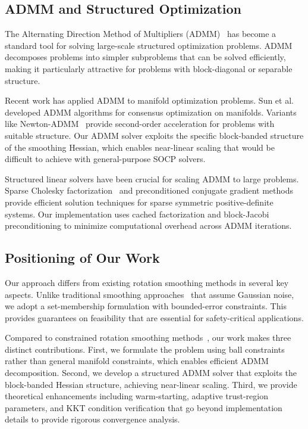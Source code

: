 \subsection{ADMM and Structured Optimization}

The Alternating Direction Method of Multipliers (ADMM)~\cite{admm} has become a standard tool for solving large-scale structured optimization problems. ADMM decomposes problems into simpler subproblems that can be solved efficiently, making it particularly attractive for problems with block-diagonal or separable structure.

Recent work has applied ADMM to manifold optimization problems. Sun et al.~\cite{sun_admm} developed ADMM algorithms for consensus optimization on manifolds. Variants like Newton-ADMM~\cite{newton_admm} provide second-order acceleration for problems with suitable structure. Our ADMM solver exploits the specific block-banded structure of the smoothing Hessian, which enables near-linear scaling that would be difficult to achieve with general-purpose SOCP solvers.

Structured linear solvers have been crucial for scaling ADMM to large problems. Sparse Cholesky factorization~\cite{golub} and preconditioned conjugate gradient methods~\cite{saad} provide efficient solution techniques for sparse symmetric positive-definite systems. Our implementation uses cached factorization and block-Jacobi preconditioning to minimize computational overhead across ADMM iterations.

\subsection{Positioning of Our Work}

Our approach differs from existing rotation smoothing methods in several key aspects. Unlike traditional smoothing approaches~\cite{sorkine_horn,markley} that assume Gaussian noise, we adopt a set-membership formulation with bounded-error constraints. This provides guarantees on feasibility that are essential for safety-critical applications.

Compared to constrained rotation smoothing methods~\cite{jia_evans,boulic}, our work makes three distinct contributions. First, we formulate the problem using ball constraints rather than general manifold constraints, which enables efficient ADMM decomposition. Second, we develop a structured ADMM solver that exploits the block-banded Hessian structure, achieving near-linear scaling. Third, we provide theoretical enhancements including warm-starting, adaptive trust-region parameters, and KKT condition verification that go beyond implementation details to provide rigorous convergence analysis.

